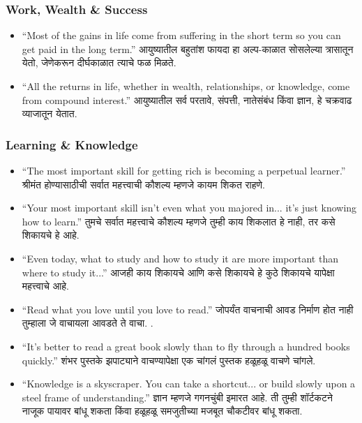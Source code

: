 \begin{frame}[fragile]\frametitle{Work, Wealth \& Success}
\begin{itemize}
    \item ``Most of the gains in life come from suffering in the short term so you can get paid in the long term.'' आयुष्यातील बहुतांश फायदा हा अल्प-काळात सोसलेल्या त्रासातून येतो, जेणेकरून दीर्घकाळात त्याचे फळ मिळते.

    \item ``All the returns in life, whether in wealth, relationships, or knowledge, come from compound interest.'' 
आयुष्यातील सर्व परतावे, संपत्ती, नातेसंबंध किंवा ज्ञान, हे चक्रवाढ व्याजातून येतात.
\end{itemize}
\end{frame}

\begin{frame}[fragile]\frametitle{Learning \& Knowledge}
\begin{itemize}
    \item ``The most important skill for getting rich is becoming a perpetual learner.'' श्रीमंत होण्यासाठीची सर्वात महत्त्वाची कौशल्य म्हणजे कायम शिकत राहणे.

    \item ``Your most important skill isn’t even what you majored in... it’s just knowing how to learn.'' तुमचे सर्वात महत्त्वाचे कौशल्य म्हणजे तुम्ही काय शिकलात हे नाही, तर कसे शिकायचे हे आहे.

    \item ``Even today, what to study and how to study it are more important than where to study it...'' आजही काय शिकायचे आणि कसे शिकायचे हे कुठे शिकायचे यापेक्षा महत्त्वाचे आहे.

    \item ``Read what you love until you love to read.'' जोपर्यंत वाचनाची आवड निर्माण होत नाही तुम्हाला जे वाचायला आवडते ते वाचा. .

    \item ``It’s better to read a great book slowly than to fly through a hundred books quickly.'' शंभर पुस्तके झपाट्याने वाचण्यापेक्षा एक चांगलं पुस्तक हळूहळू वाचणे चांगले.

    \item ``Knowledge is a skyscraper. You can take a shortcut... or build slowly upon a steel frame of understanding.'' ज्ञान म्हणजे गगनचुंबी इमारत आहे. ती तुम्ही शॉर्टकटने नाजूक पायावर बांधू शकता किंवा हळूहळू समजुतीच्या मजबूत चौकटीवर बांधू शकता.
\end{itemize}
\end{frame}


